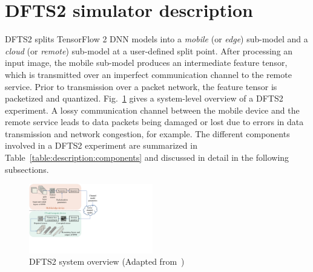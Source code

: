 \documentclass[conference,letterpaper]{IEEEtran}
\begin{document}
\section{DFTS2 simulator description}
\label{sec:description}
DFTS2 splits TensorFlow 2 DNN models into a \textit{mobile} (or \textit{edge}) sub-model and a \textit{cloud} (or \textit{remote}) sub-model at a user-defined split point. After processing an input image, the mobile sub-model produces an intermediate feature tensor, which is transmitted over an imperfect communication channel to the remote service. Prior to transmission over a packet network, the feature tensor is packetized and quantized. Fig.~\ref{fig:description:systemoverview} gives a system-level overview of a DFTS2 experiment. A lossy communication channel between the mobile device and the remote service leads to data packets being damaged or lost due to errors in data transmission and network congestion, for example. The different components involved in a DFTS2 experiment are summarized in Table~\ref{table:description:components} and discussed in detail in the following subsections.


\begin{figure}
    \centering
    \includegraphics[width=0.48\textwidth,viewport=2.391047 126.719996 531.251984 538.217984,clip]{system_overviewt_v3.pdf}
    \caption{DFTS2 system overview (Adapted from~\cite[Fig. 1]{cohen2021lightweight})}
    \label{fig:description:systemoverview}
\end{figure}
\end{document}
